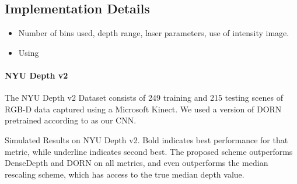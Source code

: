 \subsection{Implementation Details}
\begin{itemize}
  \item Number of bins used, depth range, laser parameters, use of intensity
    image.
  \item Using
\end{itemize}
\paragraph{NYU Depth v2}
The NYU Depth v2 Dataset consists of 249 training and 215 testing scenes of
RGB-D data captured using a Microsoft Kinect. We used a version of DORN
pretrained according to \cite{Fu2018} as our CNN.
\newpage
\begin{table*}
\begin{center}

\caption{Simulated Results on NYU Depth v2. Bold indicates best performance for
  that metric, while underline indicates second best. The proposed scheme
  outperforms DenseDepth and DORN on all metrics, and even outperforms the
  median rescaling scheme, which has access to the true median depth value.}
\end{center}
\end{table*}


